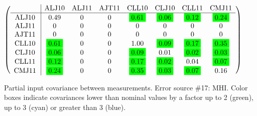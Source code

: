 \begin{table}[H]
\scriptsize
\begin{center}
\renewcommand{\arraystretch}{1.1}
\begin{math}\left(\begin{array}{c|ccccccc}
 & \mathrm{ALJ10} & 
\mathrm{ALJ11} & 
\mathrm{AJT11} & 
\mathrm{CLL10} & 
\mathrm{CLJ10} & 
\mathrm{CLL11} & 
\mathrm{CMJ11} \\
\hline
\mathrm{ALJ10} \hspace*{2pt} &       0.49 &  0 &  0 &  \colorbox{Green1}{$      0.61$} &  \colorbox{Green1}{$      0.06$} &  \colorbox{Green1}{$      0.12$} &  \colorbox{Green1}{$      0.24$} \\
\mathrm{ALJ11} \hspace*{2pt} &  0 &  0 &  0 &  0 &  0 &  0 &  0 \\
\mathrm{AJT11} \hspace*{2pt} &  0 &  0 &  0 &  0 &  0 &  0 &  0 \\
\mathrm{CLL10} \hspace*{2pt} &  \colorbox{Green1}{$      0.61$} &  0 &  0 &       1.00 &  \colorbox{Green1}{$      0.09$} &  \colorbox{Green1}{$      0.17$} &  \colorbox{Green1}{$      0.35$} \\
\mathrm{CLJ10} \hspace*{2pt} &  \colorbox{Green1}{$      0.06$} &  0 &  0 &  \colorbox{Green1}{$      0.09$} &       0.01 &  \colorbox{Green1}{$      0.02$} &  \colorbox{Green1}{$      0.03$} \\
\mathrm{CLL11} \hspace*{2pt} &  \colorbox{Green1}{$      0.12$} &  0 &  0 &  \colorbox{Green1}{$      0.17$} &  \colorbox{Green1}{$      0.02$} &       0.04 &  \colorbox{Green1}{$      0.07$} \\
\mathrm{CMJ11} \hspace*{2pt} &  \colorbox{Green1}{$      0.24$} &  0 &  0 &  \colorbox{Green1}{$      0.35$} &  \colorbox{Green1}{$      0.03$} &  \colorbox{Green1}{$      0.07$} &       0.16 \\
\end{array}\right)\end{math}
\caption{Partial input covariance between measurements. Error source \#17: MHI. Color boxes indicate covariances lower than nominal values by a factor up to 2 (green), up to 3 (cyan) or greater than 3 (blue).}
\renewcommand{\arraystretch}{1}
\end{center}
\end{table}
\clearpage
